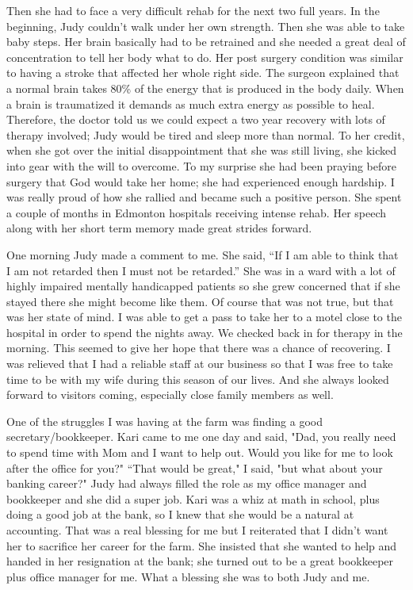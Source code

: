 \documentclass[oneside]{book}
\begin{document}
Then she had to face a very difficult rehab for the next two full years. In the beginning, Judy couldn't walk under her own strength. Then she was able to take baby steps. Her brain basically had to be retrained and she needed a great deal of concentration to tell her body what to do. Her post surgery condition was similar to having a stroke that affected her whole right side. The surgeon explained that a normal brain takes 80\% of the energy that is produced in the body daily. When a brain is traumatized it demands as much extra energy as possible to heal. Therefore, the doctor told us we could expect a two year recovery with lots of therapy involved; Judy would be tired and sleep more than normal. To her credit, when she got over the initial disappointment that she was still living, she kicked into gear with the will to overcome. To my surprise she had been praying before surgery that God would take her home; she had experienced enough hardship. I was really proud of how she rallied and became such a positive person. She spent a couple of months in Edmonton hospitals receiving intense rehab. Her speech along with her short term memory made great strides forward. 

One morning Judy made a comment to me. She said, “If I am able to think that I am not retarded then I must not be retarded.” She was in a ward with a lot of highly impaired mentally handicapped patients so she grew concerned that if she stayed there she might become like them. Of course that was not true, but that was her state of mind. I was able to get a pass to take her to a motel close to the hospital in order to spend the nights away.  We checked back in for therapy in the morning. This seemed to give her hope that there was a chance of recovering. I was relieved that I had a reliable staff at our business so that I was free to take time to be with my wife during this season of our lives. And she always looked forward to visitors coming, especially close family members as well.

One of the struggles I was having at the farm was finding a good secretary/bookkeeper. Kari came to me one day and said, "Dad, you really need to spend time with Mom and I want to help out. Would you like for me to look after the office for you?" “That would be great," I said, "but what about your banking career?" Judy had always filled the role as my office manager and bookkeeper and she did a super job. Kari was a whiz at math in school, plus doing a good job at the bank, so I knew that she would be a natural at accounting. That was a real blessing for me but I reiterated that I didn't want her to sacrifice her career for the farm. She insisted that she wanted to help and handed in her resignation at the bank; she turned out to be a great bookkeeper plus office manager for me. What a blessing she was to both Judy and me.
\end{document}
